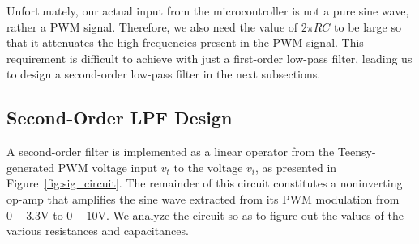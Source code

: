 Unfortunately, our actual input from the microcontroller is not a pure sine
wave, rather a PWM signal. Therefore, we also need the value of $2\pi RC$ to be
large so that it attenuates the high frequencies present in the PWM signal. This
requirement is difficult to achieve with just a first-order low-pass filter,
leading us to design a second-order low-pass filter in the next subsections.

\vspace{-1em}
\subsection{Second-Order LPF Design}
\label{ssec:second}
\vspace{-1em}

A second-order filter is implemented as a linear operator from the
Teensy-generated PWM voltage input $v_t$ to the voltage $v_i$, as presented in
Figure~\ref{fig:sig_circuit}. The remainder of this circuit constitutes a
noninverting op-amp that amplifies the sine wave extracted from its PWM
modulation from $0-3.3$\unit{\volt} to $0-10$\unit{\volt}. We analyze the
circuit so as to figure out the values of the various resistances and
capacitances.


